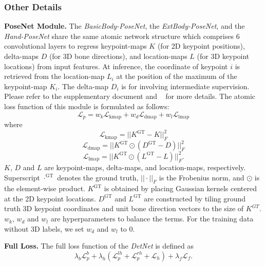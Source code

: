 \documentclass[final]{cvpr}
\begin{document}
\subsubsection{Other Details \vspace{-1mm}}
\noindent \textbf{PoseNet Module.}
\label{sec:posenet}
The \textit{BasicBody-PoseNet}, the \textit{ExtBody-PoseNet}, and the \textit{Hand-PoseNet} share the same atomic network structure which comprises 6 convolutional layers to regress keypoint-maps $K$ (for 2D keypoint positions), delta-maps $D$ (for 3D bone directions), and location-maps $L$ (for 3D keypoint locations) from input features.
At inference, the coordinate of keypoint $i$ is retrieved from the location-map $L_i$ at the position of the maximum of the keypoint-map $K_i$.
The delta-map $D_i$ is for involving intermediate supervision.
Please refer to the supplementary document and ~\cite{mehta2017vnect} for more details.
The atomic loss function of this module is formulated as follows:
\begin{equation}
  \mathcal{L}_{p} = w_k \mathcal{L}_\mathrm{kmap} + w_d \mathcal{L}_\mathrm{dmap} + w_l \mathcal{L}_\mathrm{lmap}
\end{equation}
where
\begin{equation}
  \mathcal{L}_\mathrm{kmap} = || K^{\mathrm{GT}} - K ||^2_F
\end{equation}
\begin{equation}
  \mathcal{L}_\mathrm{dmap} = || K^{\mathrm{GT}} \odot (D^{\mathrm{GT}} - D) ||^2_F
\end{equation}
\begin{equation}
  \mathcal{L}_\mathrm{lmap} = || K^{\mathrm{GT}} \odot (L^{\mathrm{GT}} - L) ||^2_F \mathrm{.}
\end{equation}
$K$, $D$ and $L$ are keypoint-maps, delta-maps, and location-maps, respectively.
Superscript $\cdot^{\mathrm{GT}}$ denotes the ground truth, $||\cdot||_F$ is the Frobenius norm, and $\odot$ is the element-wise product.
$K^{\mathrm{GT}}$ is obtained by placing Gaussian kernels centered at the 2D keypoint locations.
$D^{\mathrm{GT}}$ and $L^{\mathrm{GT}}$ are constructed by tiling ground truth 3D keypoint coordinates and unit bone direction vectors to the size of $K^{GT}$.
$w_k$, $w_d$ and $w_l$ are hyperparameters to balance the terms.
For the training data without 3D labels, we set $w_d$ and $w_l$ to 0.
\par
\noindent \textbf{Full Loss.}
The full loss function of the \textit{DetNet} is defined as
\begin{equation}
  \lambda_b \mathcal{L}_{p}^{b} + \lambda_h (\mathcal{L}_{p}^{lh} + \mathcal{L}_{p}^{rh} + \mathcal{L}_{h}) + \lambda_f \mathcal{L}_{f} \mathrm{.}
\end{equation}
\end{document}
